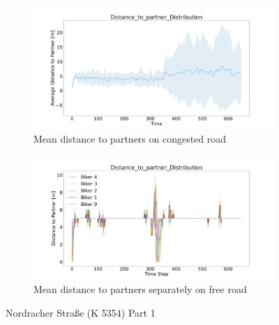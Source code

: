 \begin{figure}[H]
    \\
    \begin{subfigure}[b]{0.45\textwidth}
        \centering
        \includegraphics[width=1.0\textwidth]{images/Nordracher/Nordracher_AVG_Distance_to_partner_distribution_congested.png}
        \caption{Mean distance to partners on congested road}
    \end{subfigure}
    \hfill
    \begin{subfigure}[b]{0.45\textwidth}
        \centering
        \includegraphics[width=1.0\textwidth]{images/Nordracher/Nordracher_K6769_Distance_to_partner_distribution_free.png}
        \caption{Mean distance to partners separately on free road}
    \end{subfigure}
    \caption{Nordracher Straße (K 5354) Part 1}
\end{figure}

